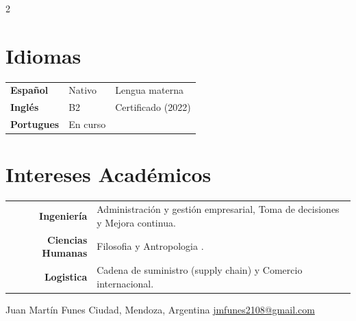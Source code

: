 \documentclass[lighthipster]{simplehipstercv}
\newlength{\rightcolwidth}
\begin{document}
\begin{paracol}{2}
\vspace{3em}

\begin{minipage}[t]{0.35\textwidth}
\section*{Idiomas}
\begin{tabular}{l | ll}
\textbf{Español} & Nativo & {\phantom{x}\footnotesize Lengua materna} \\
\textbf{Inglés} & B2 & {\phantom{x}\footnotesize Certificado (2022)} \\
\textbf{Portugues} & En curso & {\phantom{x}\footnotesize}
\end{tabular}
\bigskip
\end{minipage}\hfill
\begin{minipage}[t]{0.45\textwidth}
\section*{Intereses Académicos}
\begin{tabular}{>{\footnotesize\bfseries}r >{\footnotesize}p{}}
    Ingeniería & Administración y gestión empresarial, Toma de decisiones y Mejora continua. \\
    Ciencias Humanas & Filosofia y Antropologia . \\
    Logistica & Cadena de suministro (supply chain) y Comercio internacional.
\end{tabular}
\bigskip
\end{minipage}

\vfill{} %

\setlength{\parindent}{0pt}
\begin{minipage}[t]{\rightcolwidth}
\begin{center}\fontfamily{\sfdefault}\selectfont \color{black!70}
{\small Juan Martín Funes  Ciudad, Mendoza, Argentina \newline{} \protect\url{jmfunes2108@gmail.com}
}
\end{center}
\end{minipage}

\end{paracol}
\end{document}
